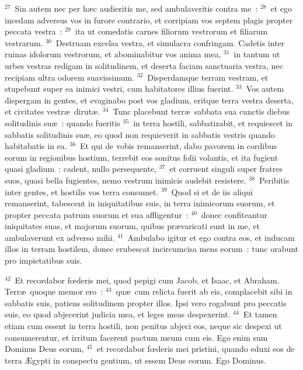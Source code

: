 ${}^{27}$~Sin autem nec per h\ae c audieritis me, sed ambulaveritis contra me~:
${}^{28}$~et ego incedam adversus vos in furore contrario, et corripiam vos septem plagis propter peccata vestra~:
${}^{29}$~ita ut comedatis carnes filiorum vestrorum et filiarum vestrarum.
${}^{30}$~Destruam excelsa vestra, et simulacra confringam. Cadetis inter ruinas idolorum vestrorum, et abominabitur vos anima mea,
${}^{31}$~in tantum ut urbes vestras redigam in solitudinem, et deserta faciam sanctuaria vestra, nec recipiam ultra odorem suavissimum.
${}^{32}$~Disperdamque terram vestram, et stupebunt super ea inimici vestri, cum habitatores illius fuerint.
${}^{33}$~Vos autem dispergam in gentes, et evaginabo post vos gladium, eritque terra vestra deserta, et civitates vestr\ae\ dirut\ae .
${}^{34}$~Tunc placebunt terr\ae\ sabbata sua cunctis diebus solitudinis su\ae~: quando fueritis
${}^{35}$~in terra hostili, sabbatizabit, et requiescet in sabbatis solitudinis su\ae , eo quod non requieverit in sabbatis vestris quando habitabatis in ea.
${}^{36}$~Et qui de vobis remanserint, dabo pavorem in cordibus eorum in regionibus hostium, terrebit eos sonitus folii volantis, et ita fugient quasi gladium~: cadent, nullo persequente,
${}^{37}$~et corruent singuli super fratres suos, quasi bella fugientes, nemo vestrum inimicis audebit resistere.
${}^{38}$~Peribitis inter gentes, et hostilis vos terra consumet.
${}^{39}$~Quod si et de iis aliqui remanserint, tabescent in iniquitatibus suis, in terra inimicorum suorum, et propter peccata patrum suorum et sua affligentur~:
${}^{40}$~donec confiteantur iniquitates suas, et majorum suorum, quibus pr\ae varicati sunt in me, et ambulaverunt ex adverso mihi.
${}^{41}$~Ambulabo igitur et ego contra eos, et inducam illos in terram hostilem, donec erubescat incircumcisa mens eorum~: tunc orabunt pro impietatibus suis.


${}^{42}$~Et recordabor fœderis mei, quod pepigi cum Jacob, et Isaac, et Abraham. Terr\ae\ quoque memor ero~:
${}^{43}$~qu\ae\ cum relicta fuerit ab eis, complacebit sibi in sabbatis suis, patiens solitudinem propter illos. Ipsi vero rogabunt pro peccatis suis, eo quod abjecerint judicia mea, et leges meas despexerint.
${}^{44}$~Et tamen etiam cum essent in terra hostili, non penitus abjeci eos, neque sic despexi ut consumerentur, et irritum facerent pactum meum cum eis. Ego enim sum Dominus Deus eorum,
${}^{45}$~et recordabor fœderis mei pristini, quando eduxi eos de terra \AE gypti in conspectu gentium, ut essem Deus eorum. Ego Dominus.

